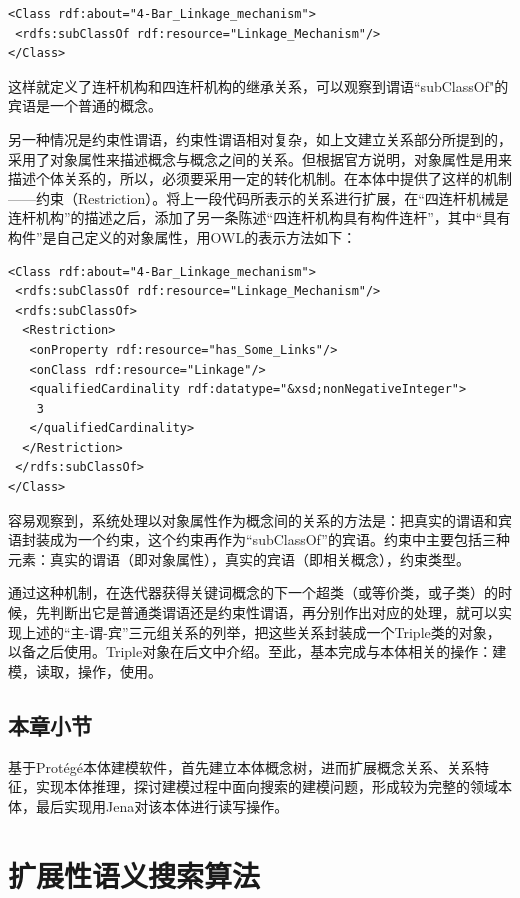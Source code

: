 \documentclass[12pt,a4paper]{article}
\begin{document}
	\lstset{language=XML,frame=lines}
	\begin{lstlisting}
<Class rdf:about="4-Bar_Linkage_mechanism">
 <rdfs:subClassOf rdf:resource="Linkage_Mechanism"/>
</Class>
	\end{lstlisting}
	
	这样就定义了连杆机构和四连杆机构的继承关系，可以观察到谓语“{\Times subClassOf}"的宾语是一个普通的概念。
	
	另一种情况是约束性谓语，约束性谓语相对复杂，如上文建立关系部分所提到的，采用了对象属性来描述概念与概念之间的关系。但根据官方说明，对象属性是用来描述个体关系的，所以，必须要采用一定的转化机制。在本体中提供了这样的机制——约束（{\Times Restriction}）。将上一段代码所表示的关系进行扩展，在“四连杆机械是连杆机构”的描述之后，添加了另一条陈述“四连杆机构具有构件连杆”，其中“具有构件”是自己定义的对象属性，用{\Times OWL}的表示方法如下：
	
	\begin{lstlisting}
<Class rdf:about="4-Bar_Linkage_mechanism">
 <rdfs:subClassOf rdf:resource="Linkage_Mechanism"/>
 <rdfs:subClassOf>
  <Restriction>
   <onProperty rdf:resource="has_Some_Links"/>
   <onClass rdf:resource="Linkage"/>
   <qualifiedCardinality rdf:datatype="&xsd;nonNegativeInteger">
    3
   </qualifiedCardinality>
  </Restriction>
 </rdfs:subClassOf>
</Class>
	\end{lstlisting}
	
	容易观察到，系统处理以对象属性作为概念间的关系的方法是：把真实的谓语和宾语封装成为一个约束，这个约束再作为“{\Times subClassOf}”的宾语。约束中主要包括三种元素：真实的谓语（即对象属性），真实的宾语（即相关概念），约束类型。
	
	通过这种机制，在迭代器获得关键词概念的下一个超类（或等价类，或子类）的时候，先判断出它是普通类谓语还是约束性谓语，再分别作出对应的处理，就可以实现上述的“主-谓-宾”三元组关系的列举，把这些关系封装成一个{\Times Triple}类的对象，以备之后使用。{\Times Triple}对象在后文中介绍。至此，基本完成与本体相关的操作：建模，读取，操作，使用。	
	
	\subsection{本章小节}
	
	基于{\Times Prot{\'e}g{\'e}}本体建模软件，首先建立本体概念树，进而扩展概念关系、关系特征，实现本体推理，探讨建模过程中面向搜索的建模问题，形成较为完整的领域本体，最后实现用{\Times Jena}对该本体进行读写操作。

	
\newpage
\section{扩展性语义搜索算法}
\setcounter{figure}{0}
\setcounter{table}{0}
\setcounter{equation}{0}
	
\end{document}

